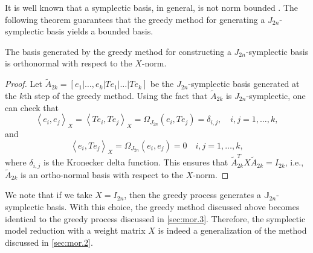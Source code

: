 It is well known that a symplectic basis, in general, is not norm bounded \cite{doi:10.1137/050628519}. The following theorem guarantees that the greedy method for generating a $J_{2n}$-symplectic basis yields a bounded basis.
\begin{theorem} \label{thm:3}
The basis generated by the greedy method for constructing a $J_{2n}$-symplectic basis is orthonormal with respect to the $X$-norm.
\end{theorem}
\begin{proof}
Let $\tilde A_{2k}=[e_1|\dots,e_k|Te_1|\dots|Te_k]$ be the $J_{2n}$-symplectic basis generated at the $k$th step of the greedy method. Using the fact that $\tilde A_{2k}$ is $J_{2n}$-symplectic, one can check that
\begin{equation} \label{eq:normmor.12}
	\left\langle e_i,e_j\right\rangle_X = \left\langle Te_i,Te_j\right\rangle_X = \Omega_{J_{2n}}(e_i,Te_j)=\delta_{i,j}, \quad i,j=1,\dots,k,	
\end{equation}
and
\begin{equation} \label{eq:normmor.13}
	\left\langle e_i,Te_j \right\rangle_X = \Omega_{J_{2n}}(e_i,e_j) = 0\quad i,j=1,\dots,k,
\end{equation}
where $\delta_{i,j}$ is the Kronecker delta function. This ensures that $\tilde A_{2k}^TX\tilde A_{2k} = I_{2k}$, i.e., $\tilde A_{2k}$ is an ortho-normal basis with respect to the $X$-norm.
\end{proof}
We note that if we take $X=I_{2n}$, then the greedy process generates a $\mathbb J_{2n}$- symplectic basis. With this choice, the greedy method discussed above becomes identical to the greedy process discussed in \cref{sec:mor.3}. Therefore, the symplectic model reduction with a weight matrix $X$ is indeed a generalization of the method discussed in \cref{sec:mor.2}.

